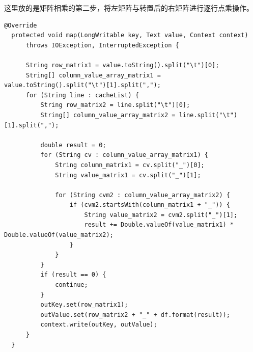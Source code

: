 \documentclass[forprint]{myreport}
\begin{document}
这里放的是矩阵相乘的第二步，将左矩阵与转置后的右矩阵进行逐行点乘操作。

\begin{lstlisting}[style = c]
  @Override
  protected void map(LongWritable key, Text value, Context context) 
      throws IOException, InterruptedException {

      String row_matrix1 = value.toString().split("\t")[0];
      String[] column_value_array_matrix1 = value.toString().split("\t")[1].split(",");
      for (String line : cacheList) {
          String row_matrix2 = line.split("\t")[0];
          String[] column_value_array_matrix2 = line.split("\t")[1].split(",");
          
          double result = 0;
          for (String cv : column_value_array_matrix1) {
              String column_matrix1 = cv.split("_")[0];
              String value_matrix1 = cv.split("_")[1];

              for (String cvm2 : column_value_array_matrix2) {
                  if (cvm2.startsWith(column_matrix1 + "_")) {
                      String value_matrix2 = cvm2.split("_")[1];
                      result += Double.valueOf(value_matrix1) * Double.valueOf(value_matrix2);
                  }
              }
          }
          if (result == 0) {
              continue;
          }
          outKey.set(row_matrix1);
          outValue.set(row_matrix2 + "_" + df.format(result));
          context.write(outKey, outValue);
      }
  }

\end{lstlisting}


\cleardoublepage
\end{document}
